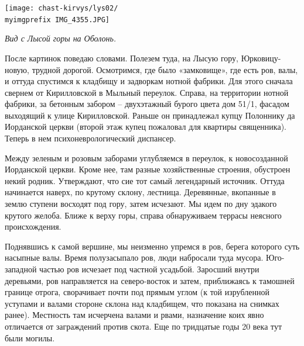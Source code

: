 \newpage

\begin{center}
\texttt{[image: chast-kirvys/lys02/\\myimgprefix IMG\_4355.JPG]}

\textit{Вид с Лысой горы на Оболонь.}
\end{center}

После картинок поведаю словами. Полезем туда, на Лысую гору, Юрковицу-новую, трудной дорогой. Осмотримся, где было «замковище», где есть ров, валы, и оттуда спустимся к кладбищу и задворкам нотной фабрики. Для этого сначала свернем от Кирилловской в Мыльный переулок. Справа, на территории нотной фабрики, за бетонным забором – двухэтажный бурого цвета дом 51/1, фасадом выходящий к улице Кирилловской. Раньше он принадлежал купцу Полоннику да Иорданской церкви (второй этаж купец пожаловал для квартиры священника). Теперь в нем психоневрологический диспансер.

Между зеленым и розовым заборами углубляемся в переулок, к новосозданной Иорданской церкви. Кроме нее, там разные хозяйственные строения, обустроен некий родник. Утверждают, что сие тот самый легендарный источник. Оттуда начинается наверх, по крутому склону, лестница. Деревянные, вкопанные в землю ступени восходят под гору, затем исчезают. Мы идем по дну эдакого крутого желоба. Ближе к верху горы, справа обнаруживаем террасы неясного происхождения.

Поднявшись к самой вершине, мы неизменно упремся в ров, берега которого суть насыпные валы. Время полузасыпало ров, люди набросали туда мусора. Юго-западной частью ров исчезает под частной усадьбой. Заросший внутри деревьями, ров направляется на северо-восток и затем, приближаясь к тамошней границе отрога, сворачивает почти под прямым углом (к той изрубленной уступами и валами стороне склона над кладбищем, что показана на снимках ранее). Местность там исчерчена валами и рвами, назначение коих явно отличается от заграждений против скота. Еще по тридцатые годы 20 века тут были могилы.

